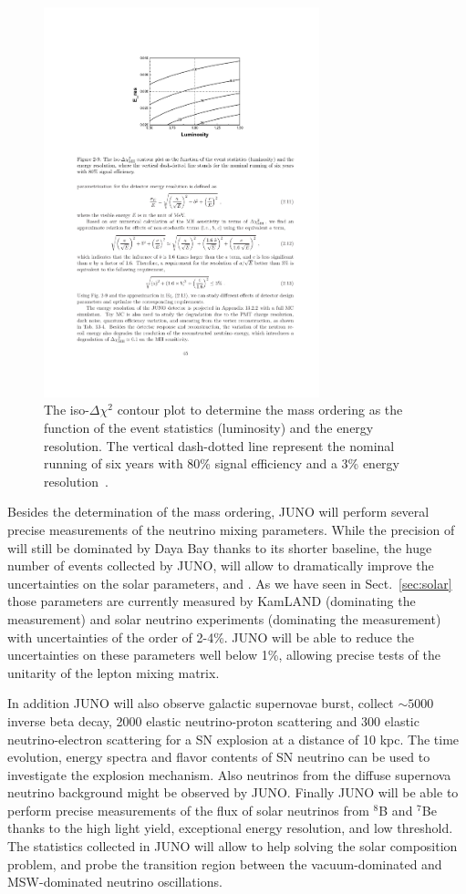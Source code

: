\begin{figure} [htbp!]
\begin{center}
\includegraphics[width=8cm]{figures/juno_energyres.pdf}
\caption{\label{fig:junoeneres} The iso-$\Delta\chi^2$ contour plot to determine the mass ordering as the function of the event statistics (luminosity) and the energy resolution. The vertical dash-dotted line represent the nominal running of six years with 80\% signal efficiency and a 3\% energy resolution~\cite{An:2015jdp}.}
\end{center}
\end{figure}


Besides the determination of the mass ordering, JUNO will perform several precise measurements of the neutrino mixing parameters. While the precision of \thint will still be dominated by Daya Bay thanks to its shorter baseline, the huge number of events collected by JUNO, will allow to dramatically improve the uncertainties on the solar parameters, \thsol and \dmsqso. As we have seen in Sect.~\ref{sec:solar} those parameters are currently measured by KamLAND (dominating the \dmsqso measurement) and solar neutrino experiments (dominating the \thsol measurement) with uncertainties of the order of 2-4\%. JUNO will be able to reduce the uncertainties on these parameters well below 1\%, allowing precise tests of the unitarity of the lepton mixing matrix.

In addition JUNO will also observe galactic supernovae burst, collect $\sim5000$ inverse beta decay, 2000 elastic neutrino-proton scattering and 300 elastic neutrino-electron scattering for a SN explosion at a distance of 10 kpc. The time evolution, energy spectra and flavor contents of SN neutrino can be used to investigate the explosion mechanism. Also neutrinos from the diffuse supernova neutrino background might be observed by JUNO. Finally JUNO will be able to perform precise measurements of the flux of solar neutrinos from $^8$B and $^7$Be thanks to the high light yield, exceptional energy resolution, and  low threshold. The statistics collected in JUNO will allow to help solving the solar composition problem, and probe the transition region between the vacuum-dominated and MSW-dominated neutrino oscillations. 

